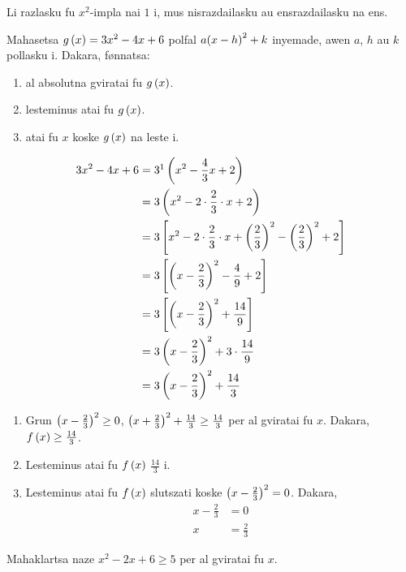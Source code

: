 Li razlasku fu \(x^2\)-impla nai \(1\) i, mus  nisrazdailasku au ensrazdailasku na ens.

\begin{tatoeba}
  Mahasetsa \(g \left(x\right)=3x^2-4x+6\) polfal \(a{\left(x-h\right)}^2+k\) inyemade,
  awen \(a\), \(h\) au \(k\) pollasku i. Dakara, fønnatsa:
  \begin{enumerate}
    \item al absolutna gviratai fu \(g \left(x\right)\).
    \item lesteminus atai fu \(g \left(x\right)\).
    \item atai fu \(x\) koske \(g \left(x\right)\) na leste i.
  \end{enumerate}
\end{tatoeba}

\begin{svarna}
  \begin{align*}
    3x^2-4x+6 &= 3\alignfoot{Razlasku \(3\) tszerena ekso made.}\tc{x^2-\frac{4}{3}x+2} \\
    &= 3\tc{x^2-2\cdot\frac{2}{3}\cdot x +2} \\
    &= 3\tl{x^2-2\cdot\frac{2}{3}\cdot x+\tc{\frac{2}{3}}^2-\tc{\frac{2}{3}}^2+2} \\
    &= 3\tl{\tc{x-\frac{2}{3}}^2-\frac{4}{9}+2} \\
    &= 3\tl{\tc{x-\frac{2}{3}}^2+\frac{14}{9}} \\
    &= 3\tc{x-\frac{2}{3}}^2+3\cdot\frac{14}{9} \\
    &= 3\tc{x-\frac{2}{3}}^2+\frac{14}{3}
  \end{align*}

  \begin{enumerate}
    \item Grun \({\left(x-\frac{2}{3}\right)}^2\geq0\),
      \({\left(x+\frac{2}{3}\right)}^2+\frac{14}{3}\geq\frac{14}{3}\) per al gviratai fu \(x\).
      Dakara, \(f \left(x\right)\geq\frac{14}{3}\).
    \item Lesteminus atai fu \(f \left(x\right)\) \(\frac{14}{3}\) i.
    \item Lesteminus atai fu \(f \left(x\right)\) slutszati koske \({\left(x-\frac{2}{3}\right)}^2=0\). Dakara,
      \begin{align*}
        x - \frac{2}{3} &= 0 \\
        x &= \frac{2}{3}
      \end{align*}
  \end{enumerate}
\end{svarna}

\begin{lyenszinen}
  Mahaklartsa naze \(x^2 - 2x + 6 \geq 5\) per al gviratai fu \(x\).
\end{lyenszinen}
